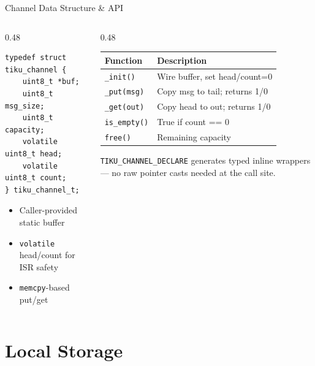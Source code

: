 \documentclass[aspectratio=169, 10pt]{beamer}
\begin{document}
\begin{frame}[fragile]{Channel Data Structure \& API}
\begin{columns}[T]
\begin{column}{0.48\textwidth}
\begin{lstlisting}[style=cstyle,
  title={kernel/process/tiku\_process.h}]
typedef struct tiku_channel {
    uint8_t *buf;
    uint8_t  msg_size;
    uint8_t  capacity;
    volatile uint8_t head;
    volatile uint8_t count;
} tiku_channel_t;
\end{lstlisting}

\begin{itemize}
  \item Caller-provided static buffer
  \item \texttt{volatile} head/count for ISR safety
  \item \texttt{memcpy}-based put/get
\end{itemize}
\end{column}

\begin{column}{0.48\textwidth}
\begin{table}
\centering
\small
\begin{tabular}{@{}lp{3.8cm}@{}}
\toprule
\textbf{Function} & \textbf{Description} \\
\midrule
\texttt{\_init()} & Wire buffer, set head/count=0 \\
\texttt{\_put(msg)} & Copy msg to tail; returns 1/0 \\
\texttt{\_get(out)} & Copy head to out; returns 1/0 \\
\texttt{is\_empty()} & True if count == 0 \\
\texttt{free()} & Remaining capacity \\
\bottomrule
\end{tabular}
\end{table}

\vspace{0.3em}
\texttt{TIKU\_CHANNEL\_DECLARE} generates
typed inline wrappers --- no raw pointer
casts needed at the call site.
\end{column}
\end{columns}
\end{frame}

\section{Local Storage}
\end{document}
